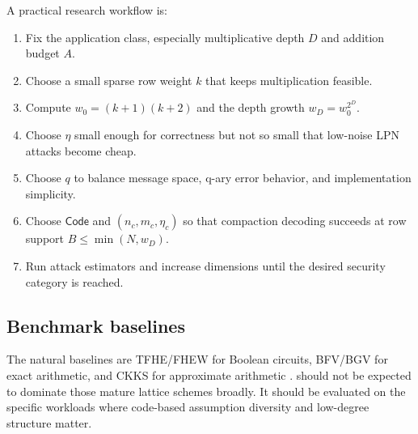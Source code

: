 A practical research workflow is:
\begin{enumerate}
    \item Fix the application class, especially multiplicative depth $D$ and addition budget $A$.
    \item Choose a small sparse row weight $k$ that keeps multiplication feasible.
    \item Compute $w_0=(k+1)(k+2)$ and the depth growth $w_D=w_0^{2^D}$.
    \item Choose $\eta$ small enough for correctness but not so small that low-noise LPN attacks become cheap.
    \item Choose $q$ to balance message space, q-ary error behavior, and implementation simplicity.
    \item Choose $\mathsf{Code}$ and $(n_c,m_c,\eta_c)$ so that compaction decoding succeeds at row support $B\le\min(N,w_D)$.
    \item Run attack estimators and increase dimensions until the desired security category is reached.
\end{enumerate}

\subsection{Benchmark baselines}

The natural baselines are TFHE/FHEW for Boolean circuits, BFV/BGV for exact arithmetic, and CKKS for approximate arithmetic \cite{DucasMicciancio2015,CGGI2020,FanVercauteren2012,BGV2014,CKKS2017}.  \sable{} should not be expected to dominate those mature lattice schemes broadly.  It should be evaluated on the specific workloads where code-based assumption diversity and low-degree structure matter.
